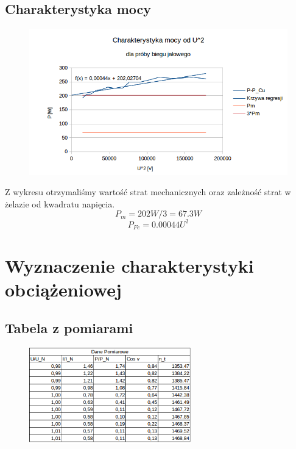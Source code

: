 \documentclass[12pt]{article}
\newcommand{\ZMa}{17}
\begin{document}
\subsection{Charakterystyka mocy}
	\begin{figure}[H]
			\centering
			\includegraphics[width=\ZMa cm]{wykresy/jalowy_moc}
	\end{figure}
Z wykresu otrzymaliśmy wartość strat mechanicznych oraz zależność strat w żelazie od kwadratu napięcia.
\begin{equation}
	P_m=202W/3=67.3W
\end{equation}
\begin{equation}
	P_{Fe}=0.00044U^2
\end{equation}

\section{Wyznaczenie charakterystyki obciążeniowej}
\subsection{Tabela z pomiarami}
	\begin{figure}[H]
			\centering
			\includegraphics[width=7cm]{tabele/obciazenie_tab}
	\end{figure}
	
\end{document}
